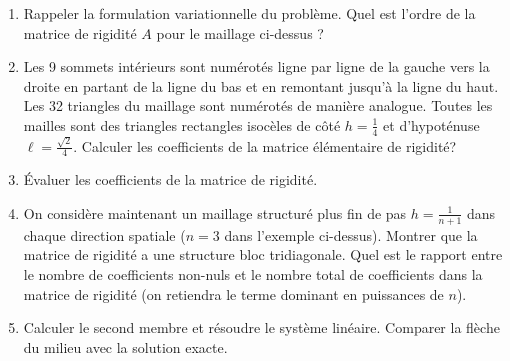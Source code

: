 \documentclass{article}
\begin{document}
\begin{enumerate}
\item Rappeler la formulation variationnelle du problème. Quel est l'ordre de la matrice de rigidité $A$ pour le maillage ci-dessus ?
\item Les 9 sommets intérieurs sont numérotés ligne par ligne de la gauche vers la droite en partant
de la ligne du bas et en remontant jusqu'à la ligne du haut. Les 32 triangles du maillage sont
numérotés de manière analogue. Toutes les mailles sont des triangles rectangles isocèles de
côté $h =\frac 14$ et d'hypoténuse $\ell=\frac{\sqrt 2}{4}$. Calculer les coefficients de la matrice élémentaire de rigidité?
\item Évaluer les coefficients de la matrice de rigidité.
\item On considère maintenant un maillage structuré plus fin de pas $h =\frac 1{n+1}$ dans chaque direction spatiale ($n = 3$ dans l'exemple ci-dessus). Montrer que la matrice de rigidité a une structure
bloc tridiagonale. Quel est le rapport entre le nombre de coefficients non-nuls et le nombre
total de coefficients dans la matrice de rigidité (on retiendra le terme dominant en puissances
de $n$).
\item Calculer le second membre et résoudre le système linéaire. Comparer la flèche du milieu avec la solution exacte.
\end{enumerate}
\end{document}
